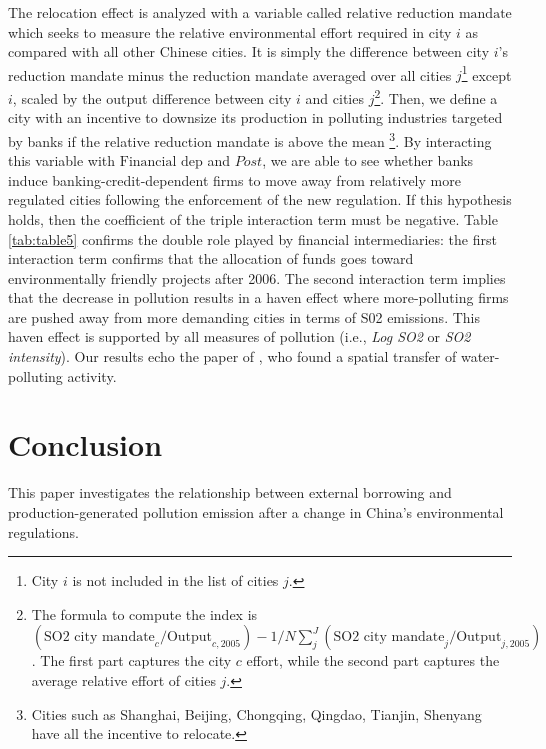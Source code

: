 \documentclass[12pt]{article}
\begin{document}
The relocation effect is analyzed with a variable called $\text{relative reduction mandate}$ which seeks to measure the relative environmental effort required in city $i$ as compared with all other Chinese cities. It is simply the difference between city $i$'s reduction mandate minus the reduction mandate averaged over all cities $j$\footnote{City $i$  is not included in the list of cities $j$.} except $i$, scaled by the output difference between city $i$ and cities $j$\footnote{The formula to compute the index is $(\text{SO2 city mandate}_c/\text{Output}_{c, 2005}) - 1/N\sum _j ^J(\text{SO2 city mandate}_j/\text{Output}_{j, 2005})$. The first part captures the city $c$ effort, while the second part captures the average relative effort of cities $j$.}. Then, we define a city with an incentive to downsize its production in polluting industries targeted by banks if the relative reduction mandate is above the mean \footnote{Cities such as Shanghai, Beijing, Chongqing, Qingdao, Tianjin, Shenyang have all the incentive to relocate.}. By interacting this variable with $\text{Financial dep}$ and $Post$, we are able to see whether banks induce banking-credit-dependent firms to move away from relatively more regulated cities following the enforcement of the new regulation. If this hypothesis holds, then the coefficient of the triple interaction term must be negative. Table \ref{tab:table5} confirms the double role played by financial intermediaries: the first interaction term confirms that the allocation of funds goes toward environmentally friendly projects after 2006. The second interaction term implies that the decrease in pollution results in a haven effect where more-polluting firms are pushed away from more demanding cities in terms of S02 emissions. This haven effect is supported by all measures of pollution (i.e., \textit{Log SO2} or \textit{SO2 intensity}). Our results echo the paper of \cite{Chen2018-ki}, who found a spatial transfer of water-polluting activity.

\section{Conclusion}

This paper investigates the relationship between external borrowing and production-generated pollution emission after a change in China’s environmental regulations.
\end{document}

